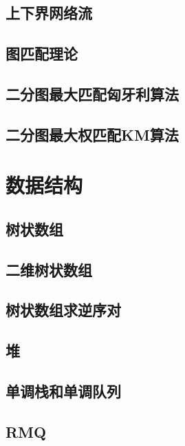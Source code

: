 \section{上下界网络流}
\raggedbottom
\hrulefill
\section{图匹配理论}
\raggedbottom
\hrulefill
\section{二分图最大匹配匈牙利算法}
\raggedbottom
\hrulefill
\section{二分图最大权匹配KM算法}
\raggedbottom
\hrulefill

\chapter{数据结构}
\section{树状数组}
\raggedbottom
\hrulefill
\section{二维树状数组}
\raggedbottom
\hrulefill
\section{树状数组求逆序对}
\raggedbottom
\hrulefill
\section{堆}
\raggedbottom
\hrulefill
\section{单调栈和单调队列}
\raggedbottom
\hrulefill
\section{RMQ}
\raggedbottom
\hrulefill
